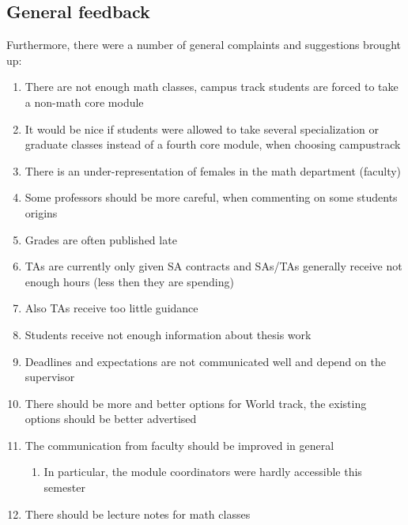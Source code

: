 \subsection{General feedback}
\label{sec-1-2}
Furthermore, there were a number of general complaints and suggestions brought up:
\begin{enumerate}
\item There are not enough math classes, campus track students are forced to take a non-math core module
\item It would be nice if students were allowed to take several specialization or graduate classes instead of a fourth core module, when choosing campustrack
\item There is an under-representation of females in the math department (faculty)
\item Some professors should be more careful, when commenting on some students origins
\item Grades are often published late
\item TAs are currently only given SA contracts and SAs/TAs generally receive not enough hours (less then they are spending)
\item Also TAs receive too little guidance
\item Students receive not enough information about thesis work
\item Deadlines and expectations are not communicated well and depend on the supervisor
\item There should be more and better options for World track, the existing options should be better advertised
\item The communication from faculty should be improved in general
\begin{enumerate}
\item In particular, the module coordinators were hardly accessible this semester
\end{enumerate}
\item There should be lecture notes for math classes
\end{enumerate}

